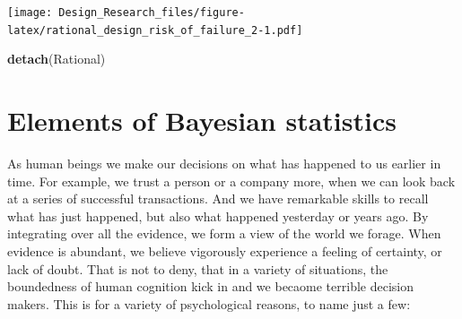 \documentclass[]{svmono}
\newenvironment{Shaded}{\begin{snugshade}}{\end{snugshade}}
\newcommand{\KeywordTok}[1]{\textcolor[rgb]{0.13,0.29,0.53}{\textbf{#1}}}
\newcommand{\DataTypeTok}[1]{\textcolor[rgb]{0.13,0.29,0.53}{#1}}
\newcommand{\DecValTok}[1]{\textcolor[rgb]{0.00,0.00,0.81}{#1}}
\newcommand{\FloatTok}[1]{\textcolor[rgb]{0.00,0.00,0.81}{#1}}
\newcommand{\StringTok}[1]{\textcolor[rgb]{0.31,0.60,0.02}{#1}}
\newcommand{\OperatorTok}[1]{\textcolor[rgb]{0.81,0.36,0.00}{\textbf{#1}}}
\newcommand{\NormalTok}[1]{#1}
\theoremstyle{definition}
\theoremstyle{definition}
\theoremstyle{definition}
\theoremstyle{remark}
\begin{document}
\begin{Shaded}
\end{Shaded}

\texttt{[image: Design\_Research\_files/figure-latex/rational\_design\_risk\_of\_failure\_2-1.pdf]}

\begin{Shaded}
\begin{Highlighting}[]
\KeywordTok{detach}\NormalTok{(Rational)}
\end{Highlighting}
\end{Shaded}

\chapter{Elements of Bayesian statistics}\label{bayesian_statistics}

As human beings we make our decisions on what has happened to us earlier
in time. For example, we trust a person or a company more, when we can
look back at a series of successful transactions. And we have remarkable
skills to recall what has just happened, but also what happened
yesterday or years ago. By integrating over all the evidence, we form a
view of the world we forage. When evidence is abundant, we believe
vigorously experience a feeling of certainty, or lack of doubt. That is
not to deny, that in a variety of situations, the boundedness of human
cognition kick in and we becaome terrible decision makers. This is for a
variety of psychological reasons, to name just a few:
\end{document}
